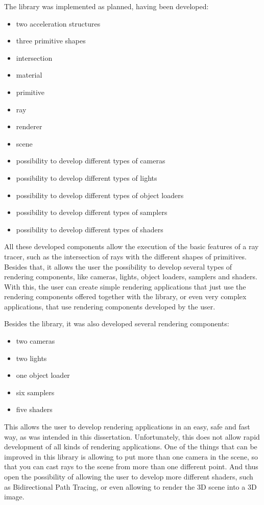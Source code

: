 \par
The library was implemented as planned, having been developed:


\begin{itemize}
	\item two acceleration structures
	\item three primitive shapes
	\item intersection
	\item material
	\item primitive
	\item ray
	\item renderer
	\item scene
	\item possibility to develop different types of cameras
	\item possibility to develop different types of lights
	\item possibility to develop different types of object loaders
	\item possibility to develop different types of samplers
	\item possibility to develop different types of shaders
\end{itemize}

\par
All these developed components allow the execution of the basic features of a ray tracer, such as the intersection of rays with the different shapes of primitives.
Besides that, it allows the user the possibility to develop several types of rendering components, like cameras, lights, object loaders, samplers and shaders.
With this, the user can create simple rendering applications that just use the rendering components offered together with the library, or even very complex applications, that use rendering components developed by the user.

\par
Besides the library, it was also developed several rendering components:

\begin{itemize}
	\item two cameras
	\item two lights
	\item one object loader
	\item six samplers
	\item five shaders
\end{itemize}

\par
This allows the user to develop rendering applications in an easy, safe and fast way, as was intended in this dissertation.
Unfortunately, this does not allow rapid development of all kinds of rendering applications.
One of the things that can be improved in this library is allowing to put more than one camera in the scene, so that you can cast rays to the scene from more than one different point.
And thus open the possibility of allowing the user to develop more different shaders, such as Bidirectional Path Tracing, or even allowing to render the 3D scene into a 3D image.

